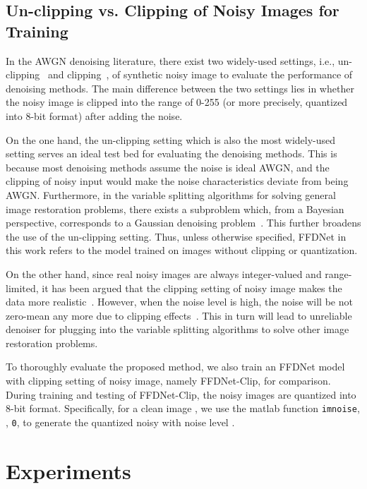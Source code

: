 \documentclass[journal]{IEEEtran}
\begin{document}
\subsection{Un-clipping  vs. Clipping of Noisy Images for Training}\label{section_clip}

In the AWGN denoising literature, there exist two widely-used settings, i.e., un-clipping~\cite{dabov2007image,gu2014weighted,burger2012image,chen2015trainable} and clipping~\cite{schmidt2014shrinkage,Vemulapalli_2016_CVPR}, of synthetic noisy image to evaluate the performance of denoising methods.
The main difference between the two settings lies in whether the noisy image is clipped into the range of 0-255 (or more precisely, quantized into 8-bit format) after adding the noise.


On the one hand, the un-clipping setting which is also the most widely-used setting serves an ideal test bed for evaluating
the denoising methods. This is because most denoising methods assume the noise is ideal AWGN, and
the clipping of noisy input would make the noise characteristics deviate from being AWGN.
Furthermore, in the variable splitting algorithms for solving general image restoration problems, there exists a subproblem which, from a Bayesian perspective, corresponds to a Gaussian denoising problem~\cite{chan2016plug,zhang2017learning}. This further broadens the use of the un-clipping setting.
Thus, unless otherwise specified, FFDNet in this work refers to the model trained on images without clipping or quantization.


On the other hand, since real noisy images are always integer-valued and range-limited,
it has been argued that the clipping setting of noisy image makes the data more realistic~\cite{schmidt2014shrinkage}.
However, when the noise level is high, the noise will be not zero-mean any more due to clipping effects~\cite{Plotz_2017_CVPR}.
This in turn will lead to unreliable denoiser for plugging into the variable splitting algorithms to solve other image restoration problems.


To thoroughly evaluate the proposed method, we also train an FFDNet model with clipping setting of noisy image, namely FFDNet-Clip, for comparison.
During training and testing of FFDNet-Clip, the noisy images are quantized into 8-bit format. Specifically, for a clean image , we use the matlab function \texttt{imnoise}, , \texttt{0}, \texttt{} to generate the quantized noisy  with noise level .



\section{Experiments}\label{sec:experiments}
\end{document}

